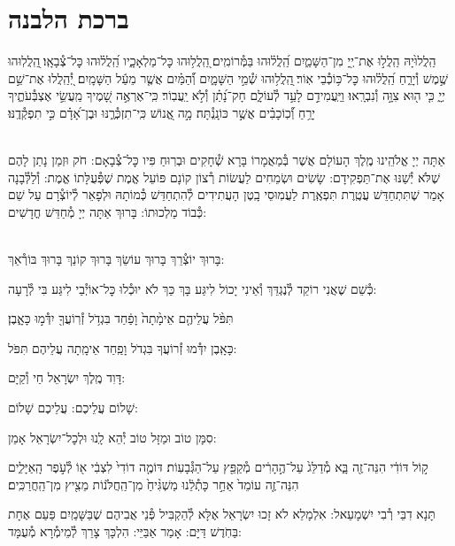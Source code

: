 \documentclass[twoside, openany, parskip=half, 11pt]{book}
\begin{document}
\section[ברכת הלבנה]{ ברכת הלבנה }

הַֽלֲלוּ֙יָהּ הַֽלֲל֣וּ אֶת־יְ֖יָ מִן־הַשָּׁמַ֑יִם הַֽ֝לֲל֗וּהוּ בַּמְּ֯רוֹמִֽים׃
֭הַֽלֲל֥וּהוּ כׇּל־מַלְאָכָ֑יו הַֽ֝לֲל֗וּהוּ כׇּל־צְ֯בָאָֽו׃
֖הַֽלֲלֽוּהוּ שֶׁ֣מֶשׁ וְ֯יָרֵ֑חַ הַֽ֝לֲל֗וּהוּ כׇּל־כּ֥וֹכְ֯בֵי אֽוֹר׃
֖הַֽלֲל֥וּהוּ שְׁ֯מֵ֣י הַשָּׁמָ֑יִם וְ֝֯הַמַּ֗יִם אֲשֶׁ֤ר מֵעַ֬ל הַשָּׁמָֽיִם׃
יְ֭֯הַֽלֲלוּ אֶת־שֵׁ֣ם יְיָ֑ כִּ֤י ה֖וּא צִוָּ֣ה וְ֯נִבְרָֽאוּ׃
וַיַּֽעֲמִידֵ֣ם לָעַ֣ד לְ֯עוֹלָ֑ם חָק־נָ֝תַ֗ן וְ֯לֹ֣א יַֽעֲבֽוֹר׃
כִּֽי־אֶרְאֶ֣ה שָׁ֭מֶיךָ מַֽעֲשֵׂ֣י אֶצְבְּ֯עֹתֶ֑יךָ יָרֵ֥חַ וְ֝֯כֽוֹכָבִ֗ים אֲשֶׁ֣ר כּוֹנָֽנְ֯תָּה׃
מָ֣ה אֱ֭נוֹשׁ כִּֽי־תִזְכְּ֯רֶ֑נּוּ וּבֶן־אָ֝דָ֗ם כִּ֣י תִפְקְ֯דֶֽנּוּ׃

\\
אַתָּה יְיָ אֱלֹהֵֽינוּ מֶֽלֶךְ הָעוֹלָם אֲשֶׁר בְּ֯מַאֲמָרוֹ בָּרָא שְׁ֯חָקִים וּבְרֽוּחַ פִּיו כׇּל־צְ֯בָאָם: חֹק וּזְמַן נָתַן לָהֶם שֶׁלֹּא יְ֯שַׁנּוּ אֶת־תַּפְקִידָם: שָׂשִׂים וּשְׂמֵחִים לַעֲשׂוֹת רְ֯צוֹן קוֹנָם פּוֹעֵל אֱמֶת שֶׁפְּ֯עֻלָּתוֹ אֱמֶת: וְ֯לַלְּ֯בָנָה אָמַר שֶׁתִּתְחַדֵּשׁ עֲטֶֽרֶת תִּפְאֶֽרֶת לַעֲמֽוּסֵי בָֽטֶן הָעֲתִידִים לְ֯הִתְחַדֵּשׁ כְּ֯מוֹתָהּ וּלְפָאֵר לְ֯יוֹצְ֯רָם עַל שֵׁם כְּ֯בוֹד מַלְכוּתוֹ: בָּרוּךְ אַתָּה יְיָ מְ֯חַדֵּשׁ חֳדָשִׁים:

\\
בָּרוּךְ יוֹצְ֯רֵךְ בָּרוּךְ עוֹשֵׂךְ בָּרוּךְ קוֹנֵךְ בָּרוּךְ בּוֹרְ֯אֵךְ:

כְּ֯שֵׁם שֶׁאֲנִי רוֹקֵד לְ֯נֶגְדֵּךְ וְ֯אֵינִי יָכוֹל לִיגַּע בָּךְ
כַּךְ לֹא יוּכְ֯לוּ כׇּל־אוֹיְ֯בַי לִיגַּע בִּי לְ֯רָעָה:

תִּפֹּ֨ל עֲלֵיהֶ֤ם אֵימָ֨תָה֙ וָפַ֔חַד בִּגְדֹ֥ל זְ֯רֽוֹעֲךָ֖ יִדְּ֯מ֣וּ כָּאָ֑בֶן׃


כָּאָֽבֶן יִדְּ֯מוּ זְ֯רוֹעֲךָ בִּגְדֹל וָפַֽחַד אֵימָֽתָה עֲלֵיהֶם תִּפֹּל:


דָּוִד מֶֽלֶךְ יִשְׂרָאֵל חַי וְ֯קַיָּם:

שָׁלוֹם עֲלֵיכֶם: \qquad {}
עֲלֵיכֶם שָׁלוֹם:


סִמָּן טוֹב וּמַזָּל טוֹב יְ֯הֵא לָֽנוּ וּלְכׇל־יִשְׂרָאֵל אָמֵן:

ק֣וֹל דּוֹדִ֔י הִנֵּה־זֶ֖ה בָּ֑א מְ֯דַלֵּג֙ עַל־הֶ֣הָרִ֔ים מְ֯קַפֵּ֖ץ עַל־הַגְּ֯בָעֽוֹת׃ דּוֹמֶ֤ה דוֹדִי֙ לִצְבִ֔י א֖וֹ לְ֯עֹ֣פֶר הָֽאַיָּלִ֑ים הִנֵּה־זֶ֤ה עוֹמֵד֙ אַחַ֣ר כָּתְ֯לֵ֔נוּ מַשְׁגִּ֨יחַ֙ מִן־הַֽחֲלֹּנ֔וֹת מֵצִ֖יץ מִן־הַֽחֲרַכִּֽים׃

תָּנָא דִבֵּי רְ֯בִי יִשְׁמָעֵאל: אִלְמָלֵא לֹא זָכוּ יִשְׂרָאֵל אֶלָּא לְ֯הַקְבִּיל פְּ֯נֵי אֲבִיהֶם שֶׁבַּשָּׁמַֽיִם פַּעַם אֶחָת בַּחֹֽדֶשׁ דַּיָּם: אָמַר אַבַּיֵּי: הִלְכָּךְ צָרֵךְ לְ֯מֵימְ֯רָא מְ֯עֻמָּד:
\end{document}
